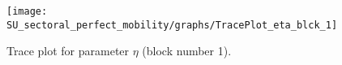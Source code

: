 \begin{figure}[H]
\centering
  \texttt{[image: SU\_sectoral\_perfect\_mobility/graphs/TracePlot\_eta\_blck\_1]}\\
    \caption{Trace plot for parameter ${\eta}$ (block number 1).}
\end{figure}

